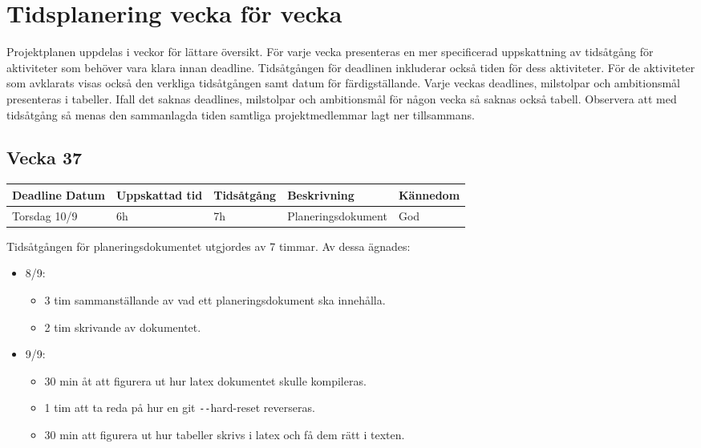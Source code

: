 \documentclass{TDP003mall}
\begin{document}
\section{Tidsplanering vecka för vecka}
Projektplanen uppdelas i veckor för lättare översikt. För varje vecka presenteras
 en mer specificerad uppskattning av tidsåtgång för aktiviteter som behöver vara
 klara innan deadline. Tidsåtgången för deadlinen inkluderar också tiden för dess
 aktiviteter. För de aktiviteter som avklarats visas också den verkliga tidsåtgången
 samt datum för färdigställande. Varje veckas deadlines, milstolpar och ambitionsmål presenteras
 i tabeller. Ifall det saknas deadlines, milstolpar och ambitionsmål för någon vecka så saknas också tabell. Observera att med tidsåtgång så menas den sammanlagda tiden samtliga projektmedlemmar lagt ner tillsammans.

\subsection{Vecka 37}
\begin{tabularx}{\linewidth}{|l|l|l|X|l|}
	\hline
	Deadline Datum & Uppskattad tid & Tidsåtgång & Beskrivning        & Kännedom \\ [0.5ex]
	\hline
	Torsdag 10/9   & 6h             & 7h         & Planeringsdokument & God      \\
	\hline
\end{tabularx}

Tidsåtgången för planeringsdokumentet utgjordes av 7 timmar. Av dessa ägnades:
\begin{itemize}
	\item 8/9:
	\begin{itemize}
		\item 3 tim sammanställande av vad ett planeringsdokument ska innehålla.
		\item 2 tim skrivande av dokumentet.
	\end{itemize}
	\item 9/9:
	\begin{itemize}
		\item 30 min åt att figurera ut hur latex dokumentet skulle kompileras.
		\item 1 tim att ta reda på hur en git \texttt{-{}-}hard-reset reverseras.
		\item 30 min att figurera ut hur tabeller skrivs i latex och få dem rätt i texten.\\
	\end{itemize}
\end{itemize}
\end{document}
